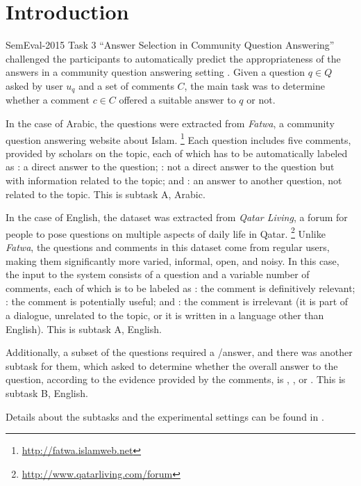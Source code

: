 \section{Introduction}
\label{sec:intro}


SemEval-2015 Task 3 ``Answer Selection in Community Question Answering''
challenged the participants to automatically predict the 
appropriateness of the answers in a community question answering 
setting \cite{Marquez-EtAl:2015:SemEval}.
Given a question $q\in Q$ asked by user $u_q$ and a set of comments $C$,
the main task was to determine whether a comment $c\in C$ offered a suitable 
answer to $q$ or not. 

In the case of Arabic, the questions were extracted from \textit{Fatwa}, a 
community question answering website about Islam.%
\footnote{\url{http://fatwa.islamweb.net}} 
Each question includes five comments, provided by scholars on 
the topic, each of which has to be automatically labeled as 
\Ni \dir: a direct answer to the question;
\Nii \rel: not a direct answer to the question but with information related to 
the topic; and 
\Niii \irel: an answer to another question, not related to the topic. 
This is subtask A, Arabic.

In the case of English, the dataset was extracted from \textit{Qatar Living}, 
a forum for people to pose questions on multiple aspects of daily life in 
Qatar.%
\footnote{\url{http://www.qatarliving.com/forum}}
Unlike \textit{Fatwa}, the questions and comments in this dataset come from 
regular users, making them significantly more varied, informal, open, and noisy. 
In this case, the input to the system consists of a question and a variable 
number of comments, each of which is to be labeled as 
\Ni \good: the comment is definitively relevant; 
\Nii \pot: the comment is potentially useful; and 
\Niii \bad: the comment is irrelevant (\eg it is part of a dialogue, unrelated 
to the topic, or it is written in a language other than English). 
This is subtask A, English.

Additionally, a subset of the questions required a \yes/\no answer,
and there was another subtask for them,
which asked to determine whether the overall answer to the question,
according to the evidence provided by the comments, is 
\Ni \yes, 
\Nii \no, or 
\Niii \unsure.
This is subtask B, English.

Details about the subtasks and the experimental settings
can be found in \cite{Marquez-EtAl:2015:SemEval}.

